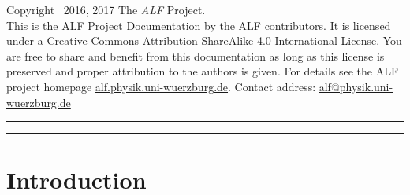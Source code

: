 \documentclass{SciPost}
\begin{document}
\vfill
Copyright \textcopyright ~2016, 2017 The \textit{ALF} Project.\\
This is the ALF Project Documentation by the ALF contributors.
It is licensed under a Creative Commons Attribution-ShareAlike 4.0 International License.
You are free to share and benefit from this documentation as long as this license is preserved
and proper attribution to the authors is given. For details see the ALF project
homepage \url{alf.physik.uni-wuerzburg.de}. Contact address: \url{alf@physik.uni-wuerzburg.de} 
\clearpage


\noindent\rule{\textwidth}{1pt}
\tableofcontents\thispagestyle{fancy}
\noindent\rule{\textwidth}{1pt}
\clearpage

%
\section{Introduction}\label{sec:intro}
%
\end{document}

